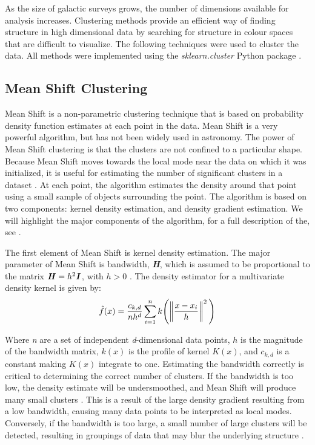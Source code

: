 As the size of galactic surveys grows, the number of dimensions available for analysis increases.
Clustering methods provide an efficient way of finding structure in high dimensional data by searching for structure in colour spaces that are difficult to visualize. 
The following techniques were used to cluster the data.
All methods were implemented using the \textit{sklearn.cluster} Python package \citep{sklearn}.

\subsection{Mean Shift Clustering} 
Mean Shift is a non-parametric clustering technique that is based on probability density function estimates at each point in the data. %
Mean Shift is a very powerful algorithm, but has not been widely used in astronomy. %
The power of Mean Shift clustering is that the clusters are not confined to a particular shape.
Because Mean Shift moves towards the local mode near the data on which it was initialized, it is useful for estimating the number of significant clusters in a dataset \citep{comanciciu02}.
At each point, the algorithm estimates the density around that point using a small sample of objects surrounding the point.
The algorithm is based on two components: kernel density estimation, and density gradient estimation.
We will highlight the major components of the algorithm, for a full description of the, see \citet{vatturi09}.

The first element of Mean Shift is kernel density estimation. 
The major parameter of Mean Shift is bandwidth, \textbf{\textit{H}}, which is assumed to be proportional to the matrix $\textbf{\textit{H}} = h^2\textbf{\textit{I}}$, with $h>0$ \citet{vatturi09}.
The density estimator for a multivariate density kernel is given by: 
\begin{equation} 
\label{eq:ms_de}
\hat{f}(x) = \frac{c_{k,d}}{nh^d} \sum_{i=1}^n k\Bigg( \norm{\frac{x-x_{i}}{h}}^2 \Bigg)
\end{equation}

Where \textit{n} are a set of independent \textit{d}-dimensional data points, $h$ is the magnitude of the bandwidth matrix, $k(x)$ is the profile of kernel $K(x)$, and $c_{k,d}$ is a constant making $K(x)$ integrate to one\citet{vatturi09}.
Estimating the bandwidth correctly is critical to determining the correct number of clusters.
If the bandwidth is too low, the density estimate will be undersmoothed, and Mean Shift will produce many small clusters \citet{vatturi09}. This is a result of the large density gradient resulting from a low bandwidth, causing many data points to be interpreted as local modes.
Conversely, if the bandwidth is too large, a small number of large clusters will be detected, resulting in groupings of data that may blur the underlying structure \citet{vatturi09}.


